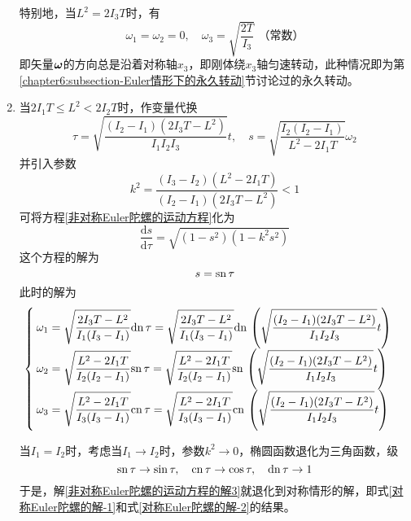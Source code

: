 \begin{enumerate}
特别地，当$L^2=2I_3T$时，有
\begin{equation*}
	\omega_1 = \omega_2 = 0,\quad \omega_3 = \sqrt{\frac{2T}{I_3}}\,\,\text{（常数）}
\end{equation*}
即矢量$\boldsymbol{\omega}$的方向总是沿着对称轴$x_3$，即刚体绕$x_3$轴匀速转动，此种情况即为第\ref{chapter6:subsection-Euler情形下的永久转动}节讨论过的永久转动。

\item 当$2I_1T\leqslant L^2<2I_2T$时，作变量代换
\begin{equation}
	\tau = \sqrt{\frac{(I_2-I_1)(2I_3T-L^2)}{I_1I_2I_3}}t,\quad s = \sqrt{\frac{I_2(I_2-I_1)}{L^2-2I_1T}}\omega_2
\end{equation}
并引入参数
\begin{equation}
	k^2 = \frac{(I_3-I_2)(L^2-2I_1T)}{(I_2-I_1)(2I_3T-L^2)}<1
\end{equation}
可将方程\eqref{非对称Euler陀螺的运动方程}化为
\begin{equation*}
	\frac{\mathrm{d}s}{\mathrm{d}\tau} = \sqrt{(1-s^2)(1-k^2s^2)}
\end{equation*}
这个方程的解为
\begin{equation*}
	s = \mathrm{sn}\, \tau
\end{equation*}
此时的解为
\begin{equation}
\begin{cases}
	\displaystyle \omega_1 = \sqrt{\frac{2I_3T-L^2}{I_1(I_3-I_1)}}\mathrm{dn}\, \tau = \sqrt{\frac{2I_3T-L^2}{I_1(I_3-I_1)}}\mathrm{dn}\, \left(\sqrt{\frac{(I_2-I_1)(2I_3T-L^2)}{I_1I_2I_3}}t\right) \\
	\displaystyle \omega_2 = \sqrt{\frac{L^2-2I_1T}{I_2(I_2-I_1)}}\mathrm{sn}\, \tau = \sqrt{\frac{L^2-2I_1T}{I_2(I_2-I_1)}}\mathrm{sn}\, \left(\sqrt{\frac{(I_2-I_1)(2I_3T-L^2)}{I_1I_2I_3}}t\right) \\
	\displaystyle \omega_3 = \sqrt{\frac{L^2-2I_1T}{I_3(I_3-I_1)}}\mathrm{cn}\, \tau = \sqrt{\frac{L^2-2I_1T}{I_3(I_3-I_1)}}\mathrm{cn}\, \left(\sqrt{\frac{(I_2-I_1)(2I_3T-L^2)}{I_1I_2I_3}}t\right)
\end{cases}
\label{非对称Euler陀螺的运动方程的解3}
\end{equation}

当$I_1=I_2$时，考虑当$I_1\to I_2$时，参数$k^2\to 0$，椭圆函数退化为三角函数，级
\begin{equation*}
	\mathrm{sn}\, \tau \to \sin \tau,\quad \mathrm{cn}\,\tau \to \cos \tau,\quad \mathrm{dn}\, \tau \to 1
\end{equation*}
于是，解\eqref{非对称Euler陀螺的运动方程的解3}就退化到对称情形的解，即式\eqref{对称Euler陀螺的解-1}和式\eqref{对称Euler陀螺的解-2}的结果。


\end{enumerate}
